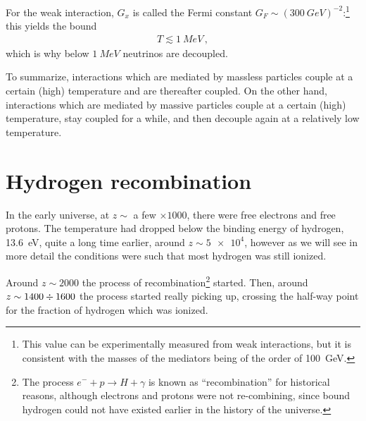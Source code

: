 \documentclass[main.tex]{subfiles}
\begin{document}

For the weak interaction, \(G_x\) is called the Fermi constant \(G_F \sim (\SI{300}{GeV})^{-2}\):\footnote{This value can be  experimentally measured from weak interactions, but it is consistent with the masses of the mediators being of the order of \SI{100}{GeV}.} this yields the bound
%
\begin{align}
T \lesssim \SI{1}{MeV}
\,,
\end{align}
%
which is why below \(\SI{1}{MeV}\) neutrinos are decoupled.


To summarize, interactions which are mediated by massless particles couple at a certain (high) temperature and are thereafter coupled.
On the other hand, interactions which are mediated by massive particles couple at a certain (high) temperature, stay coupled for a while, and then decouple again at a relatively low temperature. 

\section{Hydrogen recombination}

In the early universe, at \(z \sim\) a few \(\times 1000\), there were free electrons and free protons.
The temperature had dropped below the binding energy of hydrogen, \SI{13.6}{eV}, quite a long time earlier, around \(z \sim \num{5e4}\), however as we will see in more detail the conditions were such that most hydrogen was still ionized. 

Around \(z \sim 2000\) the process of recombination\footnote{The process \(e^{-} + p \to H + \gamma \) is known as ``recombination'' for historical reasons, although electrons and protons were not re-combining, since bound hydrogen could not have existed earlier in the history of the universe.} started.
Then, around \(z \sim 1400 \divisionsymbol 1600\) \cite[table 9.1]{LucchinColes:2002} the process started really picking up, crossing the half-way point for the fraction of hydrogen which was ionized. 
\end{document}
